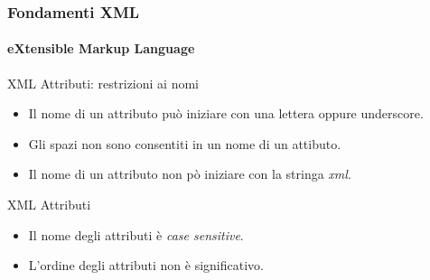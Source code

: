 \begin{frame}
    \frametitle{Fondamenti XML}
    \framesubtitle{eXtensible Markup Language}
    \addtocounter{nframe}{1}

	\begin{block}{XML Attributi: restrizioni ai nomi}
		\begin{itemize}
			\item Il nome di un attributo può iniziare con una lettera oppure underscore.
			\item Gli spazi non sono consentiti in un nome di un attibuto.
			\item Il nome di un attributo non pò iniziare con la stringa \textit{xml}.
		\end{itemize}
	\end{block}

	\begin{block}{XML Attributi}
		\begin{itemize}
			\item Il nome degli attributi è \textit{case sensitive}.
			\item L'ordine degli attributi non è significativo.
		\end{itemize}
	\end{block}

\end{frame}








